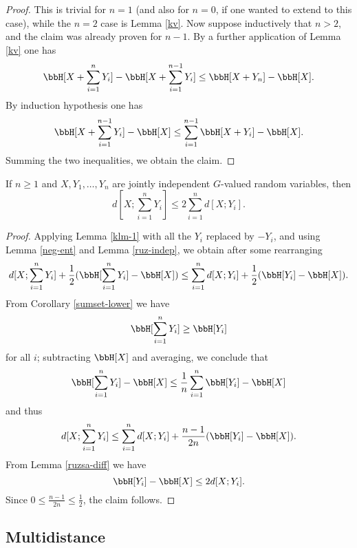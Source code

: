\begin{proof}  This is trivial for $n=1$ (and also for $n=0$, if one wanted to extend to this case), while the $n=2$ case is Lemma \ref{kv}.  Now suppose inductively that $n > 2$, and the claim was already proven for $n-1$.  By a further application of Lemma \ref{kv} one has
$$  \bbH[X + \sum_{i=1}^n Y_i] -  \bbH[X + \sum_{i=1}^{n-1} Y_i] \leq \bbH[X+Y_n] - \bbH[X].$$
By induction hypothesis one has
$$ \bbH[X + \sum_{i=1}^{n-1} Y_i] - \bbH[X] \leq \sum_{i=1}^{n-1} \bbH[X+Y_i] - \bbH[X].$$
Summing the two inequalities, we obtain the claim.
\end{proof}

\begin{lemma}\label{klm-2}  If $n \geq 1$ and $X, Y_1, \dots, Y_n$ are jointly independent $G$-valued random variables, then
  $$ d[X; \sum_{i=1}^n Y_i] \leq 2 \sum_{i=1}^n d[X; Y_i].$$
\end{lemma}

\begin{proof}
  Applying Lemma \ref{klm-1} with all the $Y_i$ replaced by $-Y_i$, and using Lemma \ref{neg-ent} and Lemma \ref{ruz-indep}, we obtain after some rearranging
$$ d[X; \sum_{i=1}^n Y_i] + \frac{1}{2} (\bbH[\sum_{i=1}^n Y_i] - \bbH[X]) \leq \sum_{i=1}^n d[X;Y_i] + \frac{1}{2} (\bbH[Y_i] - \bbH[X]).$$
From Corollary \ref{sumset-lower} we have
$$ \bbH[\sum_{i=1}^n Y_i] \geq \bbH[Y_i]$$
for all $i$; subtracting $\bbH[X]$ and averaging, we conclude that
$$ \bbH[\sum_{i=1}^n Y_i] - \bbH[X] \leq \frac{1}{n} \sum_{i=1}^n \bbH[Y_i] - \bbH[X]$$
and thus
$$ d[X; \sum_{i=1}^n Y_i] \leq \sum_{i=1}^n d[X;Y_i] + \frac{n-1}{2n} (\bbH[Y_i] - \bbH[X]).$$
From Lemma \ref{ruzsa-diff} we have
$$ \bbH[Y_i] - \bbH[X] \leq 2 d[X;Y_i].$$
Since $0 \leq \frac{n-1}{2n} \leq \frac{1}{2}$, the claim follows.
\end{proof}

\subsection{Multidistance}
